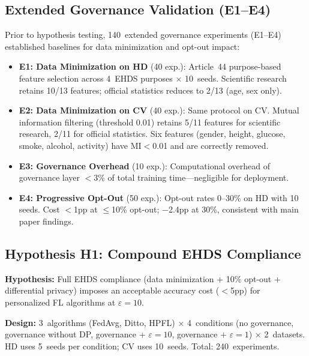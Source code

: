 \documentclass[conference]{IEEEtran}
\begin{document}
\subsection{Extended Governance Validation (E1--E4)}
\label{sec:governance_e1e4}

Prior to hypothesis testing, 140~extended governance experiments (E1--E4) established baselines for data minimization and opt-out impact:

\begin{itemize}
    \item \textbf{E1: Data Minimization on HD} (40 exp.): Article~44 purpose-based feature selection across 4~EHDS purposes $\times$ 10~seeds. Scientific research retains 10/13 features; official statistics reduces to 2/13 (age, sex only).
    \item \textbf{E2: Data Minimization on CV} (40 exp.): Same protocol on CV. Mutual information filtering (threshold 0.01) retains 5/11 features for scientific research, 2/11 for official statistics. Six features (gender, height, glucose, smoke, alcohol, activity) have MI${<}$0.01 and are correctly removed.
    \item \textbf{E3: Governance Overhead} (10 exp.): Computational overhead of governance layer $<$3\% of total training time---negligible for deployment.
    \item \textbf{E4: Progressive Opt-Out} (50 exp.): Opt-out rates 0--30\% on HD with 10 seeds. Cost $<$1pp at $\leq$10\% opt-out; $-$2.4pp at 30\%, consistent with main paper findings.
\end{itemize}

\subsection{Hypothesis H1: Compound EHDS Compliance}
\label{sec:h1_compliance}

\textbf{Hypothesis:} Full EHDS compliance (data minimization + 10\% opt-out + differential privacy) imposes an acceptable accuracy cost ($<$5pp) for personalized FL algorithms at $\varepsilon{=}10$.

\textbf{Design:} 3~algorithms (FedAvg, Ditto, HPFL) $\times$ 4~conditions (no governance, governance without DP, governance + $\varepsilon{=}10$, governance + $\varepsilon{=}1$) $\times$ 2~datasets. HD uses 5~seeds per condition; CV uses 10~seeds. Total: 240~experiments.
\end{document}
